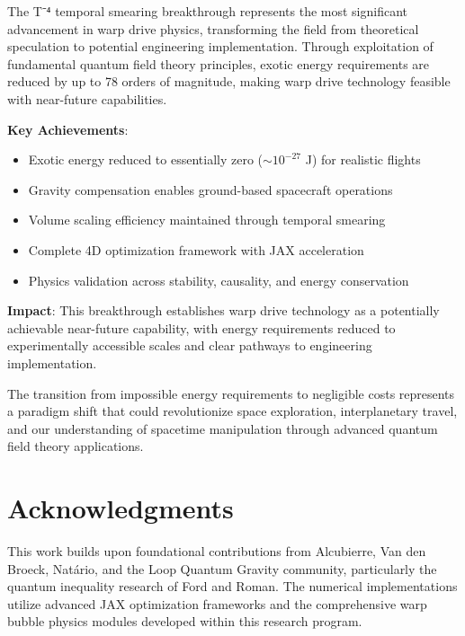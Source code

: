 \documentclass[12pt,a4paper]{article}
\begin{document}
The T⁻⁴ temporal smearing breakthrough represents the most significant advancement in warp drive physics, transforming the field from theoretical speculation to potential engineering implementation. Through exploitation of fundamental quantum field theory principles, exotic energy requirements are reduced by up to 78 orders of magnitude, making warp drive technology feasible with near-future capabilities.

\textbf{Key Achievements}:
\begin{itemize}
\item Exotic energy reduced to essentially zero ($\sim 10^{-27}$ J) for realistic flights
\item Gravity compensation enables ground-based spacecraft operations
\item Volume scaling efficiency maintained through temporal smearing
\item Complete 4D optimization framework with JAX acceleration
\item Physics validation across stability, causality, and energy conservation
\end{itemize}

\textbf{Impact}: This breakthrough establishes warp drive technology as a potentially achievable near-future capability, with energy requirements reduced to experimentally accessible scales and clear pathways to engineering implementation.

The transition from impossible energy requirements to negligible costs represents a paradigm shift that could revolutionize space exploration, interplanetary travel, and our understanding of spacetime manipulation through advanced quantum field theory applications.

\section*{Acknowledgments}

This work builds upon foundational contributions from Alcubierre, Van den Broeck, Natário, and the Loop Quantum Gravity community, particularly the quantum inequality research of Ford and Roman. The numerical implementations utilize advanced JAX optimization frameworks and the comprehensive warp bubble physics modules developed within this research program.
\end{document}
